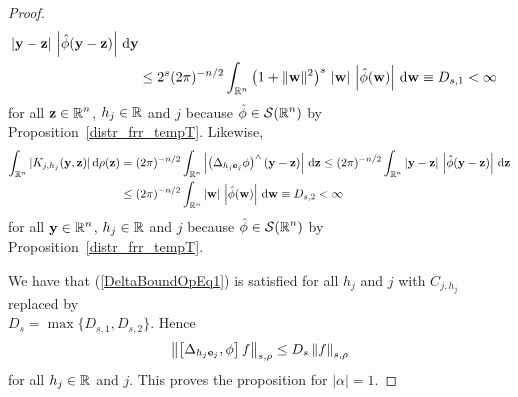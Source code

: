 \begin{proof}
\begin{align*}
\,|\mathbf{y}-\mathbf{z}|\,
\left|\hat{\phi}(\mathbf{y} -\mathbf{z})\right| \,\mathrm{d}{\mathbf{y}} \\
&\leq 2^s (2\pi)^{-n/2} \int_{\mathbb{R}^n} \left(1+\|\mathbf{w}\|^2\right)^{s}
\, |\mathbf{w}| \, \left|\hat{\phi}(\mathbf{w})\right|\,\mathrm{d}{\mathbf{w}}
\equiv D_{s,1} < \infty
\end{align*}
for all $\displaystyle \mathbf{z}\in \mathbb{R}^n$, $h_j \in \mathbb{R}$ and $j$
because $\displaystyle \hat{\phi} \in \mathcal{S}(\mathbb{R}^n)$ by
Proposition~\ref{distr_frr_tempT}.  Likewise,
\begin{align*}
\int_{\mathbb{R}^n} |K_{j,h_j}(\mathbf{y}, \mathbf{z})| \,\mathrm{d}{\rho(\mathbf{z})}
&= (2\pi)^{-n/2}\int_{\mathbb{R}^n} \left| \left(\Delta_{h_j\mathbf{e}_j} \phi\right)^\wedge
(\mathbf{y} - \mathbf{z})\right|\,\mathrm{d}{\mathbf{z}}
\leq (2\pi)^{-n/2} \int_{\mathbb{R}^n} |\mathbf{y}-\mathbf{z}|\,
\left|\hat{\phi}(\mathbf{y} -\mathbf{z}) \right|\,\mathrm{d}{\mathbf{z}} \\
&\leq  (2\pi)^{-n/2}\int_{\mathbb{R}^n} |\mathbf{w}|\,
\left|\hat{\phi}(\mathbf{w})\right|\,\mathrm{d}{\mathbf{w}} \equiv D_{s,2} < \infty
\end{align*}
for all $\displaystyle \mathbf{y}\in \mathbb{R}^n$, $h_j \in \mathbb{R}$ and $j$  because
$\displaystyle \hat{\phi} \in \mathcal{S}(\mathbb{R}^n)$ by Proposition~\ref{distr_frr_tempT}.

We have that (\ref{DeltaBoundOpEq1}) is satisfied for all $h_j$ and
$j$ with $C_{j,h_j}$ replaced by\\
$D_s = \max\{D_{s,1},D_{s,2}\}$.  Hence
\begin{equation} \label{DeltaBoundOpEq2}
\left\| \left[ \Delta_{h_j\mathbf{e}_j} ,\phi \right] f \right\|_{s,\rho}
\leq D_s \left\| f \right\|_{s,\rho}
\end{equation}
for all $h_j \in \mathbb{R}$ and $j$.  This proves the proposition for $|\alpha|=1$.


\end{proof}
